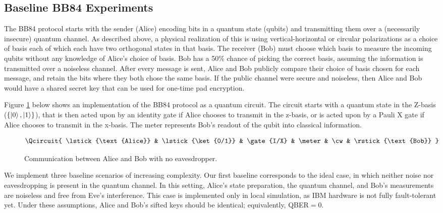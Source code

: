
\subsection{Baseline BB84 Experiments} \label{sec:graph}


The BB84 protocol starts with the sender (Alice) encoding bits in a quantum state (qubits) and transmitting them over a (necessarily insecure) quantum channel. As described above, a physical realization of this is using vertical-horizontal or circular polarizations as a choice of basis each of which each have two orthogonal states in that basis. The receiver (Bob) must choose which basis to measure the incoming qubits without any knowledge of Alice's choice of basis. Bob has a 50\% chance of picking the correct basis, assuming the information is transmitted over a noiseless channel. After every message is sent, Alice and Bob publicly compare their choice of basis chosen for each message, and retain the bits where they both chose the same basis. If the public channel were secure and noiseless, then Alice and Bob would have a shared secret key that can be used for one-time pad encryption.

Figure \ref{fig:ideal} below shows an implementation of the BB84 protocol as a quantum circuit. The circuit starts with a quantum state in the Z-basis ($\left\{\ket{0}, \ket{1}\right\}$), that is then acted upon by an identity gate if Alice chooses to transmit in the z-basis, or is acted upon by a Pauli X gate if Alice chooses to transmit in the x-basis. The meter represents Bob's readout of the qubit into classical information.
\begin{figure}[ht]
    \centering
    \[
    \Qcircuit{
        \lstick{\text{Alice}} & \lstick{\ket{0/1}} & \gate{I/X} & \meter & \cw & \rstick{\text{Bob}}
    }
    \]
    \caption{Communication between Alice and Bob with no eavesdropper.}
    \label{fig:ideal}
\end{figure}


We implement three baseline scenarios of increasing complexity.
Our first baseline corresponds to the ideal case, in which neither noise nor eavesdropping is present in the quantum channel. In this setting, Alice’s state preparation, the quantum channel, and Bob’s measurements are noiseless and free from Eve's interference. This case is implemented only in local simulation, as IBM hardware is not fully fault-tolerant yet. Under these assumptions, Alice and Bob’s sifted keys should be identical; equivalently, QBER$ = 0$.

